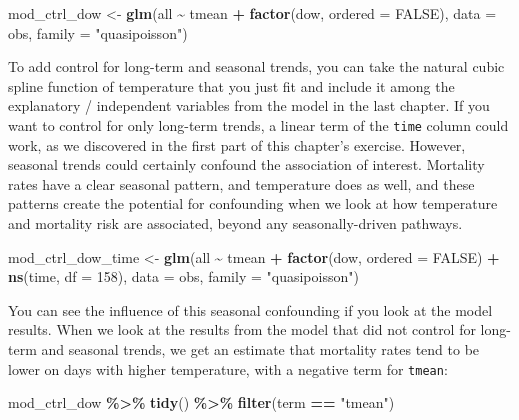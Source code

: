 \documentclass[
]{book}
\newenvironment{Shaded}{\begin{snugshade}}{\end{snugshade}}
\newcommand{\AttributeTok}[1]{\textcolor[rgb]{0.13,0.29,0.53}{#1}}
\newcommand{\ConstantTok}[1]{\textcolor[rgb]{0.56,0.35,0.01}{#1}}
\newcommand{\DecValTok}[1]{\textcolor[rgb]{0.00,0.00,0.81}{#1}}
\newcommand{\FunctionTok}[1]{\textcolor[rgb]{0.13,0.29,0.53}{\textbf{#1}}}
\newcommand{\NormalTok}[1]{#1}
\newcommand{\OtherTok}[1]{\textcolor[rgb]{0.56,0.35,0.01}{#1}}
\newcommand{\SpecialCharTok}[1]{\textcolor[rgb]{0.81,0.36,0.00}{\textbf{#1}}}
\newcommand{\StringTok}[1]{\textcolor[rgb]{0.31,0.60,0.02}{#1}}
\begin{document}
\begin{Shaded}
\begin{Highlighting}[]
\NormalTok{mod\_ctrl\_dow }\OtherTok{\textless{}{-}} \FunctionTok{glm}\NormalTok{(all }\SpecialCharTok{\textasciitilde{}}\NormalTok{ tmean }\SpecialCharTok{+} \FunctionTok{factor}\NormalTok{(dow, }\AttributeTok{ordered =} \ConstantTok{FALSE}\NormalTok{), }
                    \AttributeTok{data =}\NormalTok{ obs, }\AttributeTok{family =} \StringTok{"quasipoisson"}\NormalTok{)}
\end{Highlighting}
\end{Shaded}

To add control for long-term and seasonal trends, you can take the natural cubic
spline function of temperature that you just fit and include it among the
explanatory / independent variables from the model in the last chapter. If you
want to control for only long-term trends, a linear term of the \texttt{time} column
could work, as we discovered in the first part of this chapter's exercise.
However, seasonal trends could certainly confound the association of interest.
Mortality rates have a clear seasonal pattern, and temperature does as well,
and these patterns create the potential for confounding when we look at how
temperature and mortality risk are associated, beyond any seasonally-driven
pathways.

\begin{Shaded}
\begin{Highlighting}[]
\NormalTok{mod\_ctrl\_dow\_time }\OtherTok{\textless{}{-}} \FunctionTok{glm}\NormalTok{(all }\SpecialCharTok{\textasciitilde{}}\NormalTok{ tmean }\SpecialCharTok{+} \FunctionTok{factor}\NormalTok{(dow, }\AttributeTok{ordered =} \ConstantTok{FALSE}\NormalTok{) }\SpecialCharTok{+}
                           \FunctionTok{ns}\NormalTok{(time, }\AttributeTok{df =} \DecValTok{158}\NormalTok{), }
                         \AttributeTok{data =}\NormalTok{ obs, }\AttributeTok{family =} \StringTok{"quasipoisson"}\NormalTok{)}
\end{Highlighting}
\end{Shaded}

You can see the influence of this seasonal confounding if you look at the model
results. When we look at the results from the model that did not control for
long-term and seasonal trends, we get an estimate that mortality rates tend to
be lower on days with higher temperature, with a negative term for \texttt{tmean}:

\begin{Shaded}
\begin{Highlighting}[]
\NormalTok{mod\_ctrl\_dow }\SpecialCharTok{\%\textgreater{}\%} 
  \FunctionTok{tidy}\NormalTok{() }\SpecialCharTok{\%\textgreater{}\%} 
  \FunctionTok{filter}\NormalTok{(term }\SpecialCharTok{==} \StringTok{"tmean"}\NormalTok{)}
\end{Highlighting}
\end{Shaded}
\end{document}
